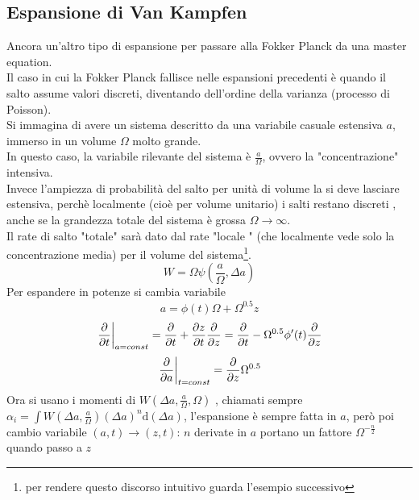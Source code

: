 \documentclass[a4paper,12pt]{article}
\newcommand{\eva}[2]{\left.#1\right|_{#2}}
\theoremstyle{plain}
\theoremstyle{definition}
\newcommand{\f}[2]{\frac{#1}{#2}}
\renewcommand{\d}{\text{d}}
\newcommand{\ra}{\rightarrow}
\theoremstyle{remark}
\begin{document}
\subsection{Espansione di Van Kampfen}
Ancora un'altro tipo di espansione per passare alla Fokker Planck da una master equation.\\Il caso in cui la Fokker Planck fallisce nelle espansioni precedenti è quando il salto assume valori discreti, diventando dell'ordine della varianza (processo di Poisson).
\\Si immagina di avere un sistema descritto da una variabile casuale estensiva $a$, immerso in un volume $\Omega$ molto grande. \\In questo caso, la variabile rilevante del sistema è $\f{a}{\Omega}$, ovvero la "concentrazione" intensiva.\\Invece l'ampiezza di probabilità del salto per unità di volume  la si deve lasciare estensiva, perchè localmente (cioè per volume unitario) i salti restano discreti , anche se la grandezza totale del sistema è grossa $\Omega\ra \infty$.\\Il rate di salto "totale" sarà dato dal rate "locale " (che localmente vede solo la concentrazione media) per il volume del sistema\footnote{per rendere questo discorso intuitivo guarda l'esempio successivo}.
\[W=\Omega\psi(\f{a}{\Omega},\Delta a)\]
Per espandere in potenze si cambia variabile
\[a=\phi(t)\Omega+\Omega^{0.5}z		\]
\[\eva{\pdv{t}}{a=const}=\pdv{t}+\pdv{z}{t}\pdv{z}=\pdv{t}-\Omega^{0.5}\phi'(t)\pdv{z}	\]
\[\eva{\pdv{a}}{t=const}=\pdv{z} \Omega^{0.5}\]
Ora si usano i momenti di $W(\Delta a,\f{a}{\Omega},\Omega)$ , chiamati sempre	 $\alpha_i=\int W(\Delta a,\f{a}{\Omega})	(\Delta a)^n \d (\Delta a)	$, l'espansione è sempre fatta in $a$, però poi cambio variabile $(a,t)\ra (z,t)$: $n$ derivate in $a$ portano un fattore $\Omega^{-\f{n}{2}}$ quando passo a $z$
\end{document}

